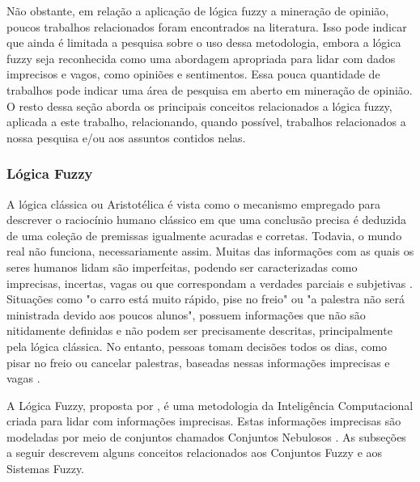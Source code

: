 \documentclass[template.tex]{subfiles}
\begin{document}
Não obstante, em relação a aplicação de lógica fuzzy a mineração de opinião, poucos trabalhos relacionados foram encontrados na literatura. Isso pode indicar que ainda é limitada a pesquisa sobre o uso dessa metodologia, embora a lógica fuzzy seja reconhecida como uma abordagem apropriada para lidar com dados imprecisos e vagos, como opiniões e sentimentos. Essa pouca quantidade de trabalhos pode indicar uma área de pesquisa em aberto em mineração de opinião. O resto dessa seção aborda os principais conceitos relacionados a lógica fuzzy, aplicada a este trabalho, relacionando, quando possível, trabalhos relacionados a nossa pesquisa e/ou aos assuntos contidos nelas.

\subsubsection{Lógica Fuzzy}

A lógica clássica ou Aristotélica é vista como o mecanismo empregado para descrever o raciocínio humano clássico em que uma conclusão precisa é deduzida de uma coleção de premissas igualmente acuradas e corretas. Todavia, o mundo real não funciona, necessariamente assim. Muitas das informações com as quais os seres humanos lidam são imperfeitas, podendo ser caracterizadas como imprecisas, incertas, vagas ou que correspondam a verdades parciais e subjetivas \cite{araujo2009palestra}.  Situações como "o carro está muito rápido, pise no freio" ou "a palestra não será ministrada devido aos poucos alunos", possuem informações que não são nitidamente definidas e não podem ser precisamente descritas, principalmente pela lógica clássica. No entanto, pessoas tomam decisões todos os dias, como pisar no freio ou cancelar palestras, baseadas nessas informações imprecisas e vagas \cite{araujo2009palestra}. 

A Lógica Fuzzy, proposta por , é uma metodologia da Inteligência Computacional criada para lidar com informações imprecisas. Estas informações imprecisas são modeladas por meio de conjuntos chamados Conjuntos Nebulosos \cite{zadeh1965fuzzy}. As subseções a seguir descrevem alguns conceitos relacionados aos Conjuntos Fuzzy e aos Sistemas Fuzzy.

\end{document}

